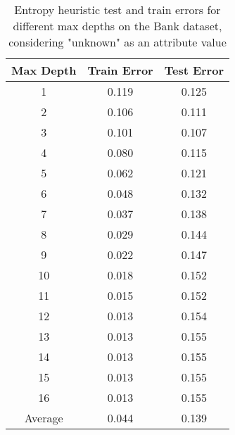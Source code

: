 \documentclass[12pt, fullpage,letterpaper]{article}
\begin{document}
\begin{enumerate}
\begin{enumerate}
\newpage
\begin{table}[ht]
	\centering
	\begin{tabular}{|c|c|c|}
        \hline
		Max Depth & Train Error & Test Error\\ 
		\hline\hline
		1 & 0.119 & 0.125 \\ \hline
		2 & 0.106 & 0.111 \\ \hline
		3 & 0.101 & 0.107 \\ \hline
		4 & 0.080 & 0.115 \\ \hline
		5 & 0.062 & 0.121 \\ \hline
		6 & 0.048 & 0.132 \\ \hline
		7 & 0.037 & 0.138 \\ \hline
		8 & 0.029 & 0.144 \\ \hline
		9 & 0.022 & 0.147 \\ \hline
		10 & 0.018 & 0.152 \\ \hline
		11 & 0.015 & 0.152 \\ \hline
		12 & 0.013 & 0.154 \\ \hline
		13 & 0.013 & 0.155 \\ \hline
		14 & 0.013 & 0.155 \\ \hline
		15 & 0.013 & 0.155 \\ \hline
		16 & 0.013 & 0.155 \\ \hline
		Average & 0.044 & 0.139 \\ \hline
	\end{tabular}
	\caption{Entropy heuristic test and train errors for different max depths on the Bank dataset, considering "unknown" as an attribute value}
    \label{table:3aentropy}
\end{table}


\end{enumerate}
\end{enumerate}
\end{document}
